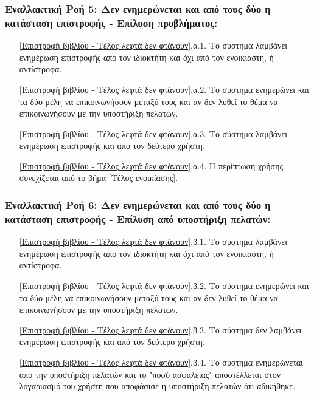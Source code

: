 \documentclass[12pt,a4paper]{article}
\begin{document}
\subsubsection*{Εναλλακτική Ροή 5: Δεν ενημερώνεται και από τους δύο η κατάσταση επιστροφής - Επίλυση προβλήματος:}
\begin{enumerate}
    \item[\ref{Επιστροφή βιβλίου - Τέλος λεφτά δεν φτάνουν}.α.1.] Το σύστημα λαμβάνει ενημέρωση επιστροφής από τον ιδιοκτήτη και όχι από τον ενοικιαστή, ή αντίστροφα.
    \item[\ref{Επιστροφή βιβλίου - Τέλος λεφτά δεν φτάνουν}.α.2.] Το σύστημα ενημερώνει και τα δύο μέλη να επικοινωνήσουν μεταξύ τους και αν δεν λυθεί το θέμα να επικοινωνήσουν με την υποστήριξη πελατών.
    \item[\ref{Επιστροφή βιβλίου - Τέλος λεφτά δεν φτάνουν}.α.3.] Το σύστημα λαμβάνει ενημέρωση επιστροφής και από τον δεύτερο χρήστη.
    \item[\ref{Επιστροφή βιβλίου - Τέλος λεφτά δεν φτάνουν}.α.4.] Η περίπτωση χρήσης συνεχίζεται από το βήμα \ref{Τέλος ενοικίασης}.
\end{enumerate}

\subsubsection*{Εναλλακτική Ροή 6: Δεν ενημερώνεται και από τους δύο η κατάσταση επιστροφής - Επίλυση από υποστήριξη πελατών:}
\begin{enumerate}
    \item[\ref{Επιστροφή βιβλίου - Τέλος λεφτά δεν φτάνουν}.β.1.] Το σύστημα λαμβάνει ενημέρωση επιστροφής από τον ιδιοκτήτη και όχι από τον ενοικιαστή, ή αντίστροφα.
    \item[\ref{Επιστροφή βιβλίου - Τέλος λεφτά δεν φτάνουν}.β.2.] Το σύστημα ενημερώνει και τα δύο μέλη να επικοινωνήσουν μεταξύ τους και αν δεν λυθεί το θέμα να επικοινωνήσουν με την υποστήριξη πελατών.
    \item[\ref{Επιστροφή βιβλίου - Τέλος λεφτά δεν φτάνουν}.β.3.] Το σύστημα δεν λαμβάνει ενημέρωση επιστροφής και από τον δεύτερο χρήστη.
    \item[\ref{Επιστροφή βιβλίου - Τέλος λεφτά δεν φτάνουν}.β.4.] Το σύστημα ενημερώνεται από την υποστήριξη πελατών και το "ποσό ασφαλείας" αποστέλλεται στον λογαριασμό του χρήστη που αποφάσισε η υποστήριξη πελατών ότι αδικήθηκε.
\end{enumerate}
\end{document}
